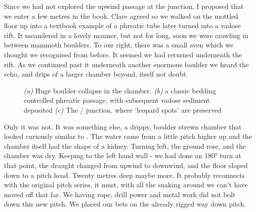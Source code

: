 Since we had not explored the upwind passage at the junction, I proposed that we enter a few metres in the book. Clare agreed so we walked on the mottled floor up into a textbook example of a phreatic tube later turned into a vadose rift. It meandered in a lovely manner, but not for long, soon we were crawling in between mammoth boulders. To our right, there was a small aven which we thought we recognised from before. It seemed we had returned underneath the  rift. As we continued past it underneath another enormous boulder we heard the echo, and drips of a larger chamber beyond,  itself not doubt.





\begin{figure}[t!]
\checkoddpage \ifoddpage \forcerectofloat \else \forceversofloat \fi
\centering
    \begin{subfigure}[t]{0.353\textwidth}
        \centering
        
        \caption{} \label{traverse over buckwheat}
    \end{subfigure}
        \hfill
\begin{subfigure}[t]{0.63\textwidth}
\centering
{}
 \caption{}\label{passage in Deja VU}
\end{subfigure}
    \vspace{0cm}
    \begin{subfigure}[t]{\textwidth}
    \centering
       
        \caption{} \label{Deja vu}
    \end{subfigure}
    \caption{
    \textit{(a)} Huge boulder collapse in the \protect{} chamber.  
     \textit{(b)} \protect{} a classic bedding controlled phreatic passage, with subsequent vadose sediment deposited
     \textit{(c)} The  \protect{}/ \protect{} junction, where `leopard spots' are preserved }
\end{figure}


Only it was not. It was something else, a drippy, boulder strewn chamber that looked curiously similar to . The water came from a little pitch higher up and the chamber itself had the shape of a kidney. Turning left, the ground rose, and the chamber was dry. Keeping to the left hand wall - we had done an 180° turn at that point, the draught changed from upwind to downwind, and the floor sloped down to a pitch head. Twenty metres deep maybe more. It probably reconnects with the original pitch series, it must, with all the snaking around we can't have moved off that far. We having rope, drill power and metal work did not bolt down this new pitch. We placed our bets on the already rigged way down  pitch. 


